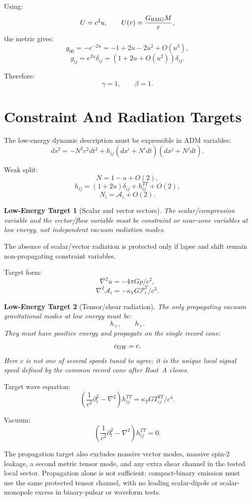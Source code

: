 \documentclass[11pt]{article}
\newtheorem{target}{Low-Energy Target}
\begin{document}
Using:
\[
U=c^2u,
\qquad
U(r)=\frac{G_{\rm RMG}M}{r},
\]
the metric gives:
\[
g_{00}
=
-e^{-2u}
=
-1+2u-2u^2+O(u^3),
\]
\[
g_{ij}
=
e^{2u}\delta_{ij}
=
(1+2u+O(u^2))\delta_{ij}.
\]

Therefore:
\[
\boxed{
\gamma=1,
\qquad
\beta=1.
}
\]

\section{Constraint And Radiation Targets}

The low-energy dynamic description must be expressible in ADM variables:
\[
ds^2
=
-N^2c^2dt^2
+h_{ij}(dx^i+N^idt)(dx^j+N^jdt).
\]

Weak split:
\[
N=1-u+O(2),
\]
\[
h_{ij}=(1+2u)\delta_{ij}+h_{ij}^{TT}+O(2),
\]
\[
N_i=\mathcal A_i+O(2).
\]

\begin{target}[Scalar and vector sectors]
The scalar/compression variable and the vector/flow variable must be
constraint or near-zone variables at low energy, not independent vacuum
radiation modes.
\end{target}

The absence of scalar/vector radiation is protected only if lapse and shift
remain non-propagating constraint variables.

Target form:
\[
\nabla^2u=-4\pi G\rho/c^2,
\]
\[
\nabla^2\mathcal A_i
=
-
\kappa_VG\mathcal P_i^T/c^3.
\]

\begin{target}[Tensor/shear radiation]
The only propagating vacuum gravitational modes at low energy must be:
\[
h_+,
\qquad
h_\times.
\]
They must have positive energy and propagate on the single record cone:
\[
c_{\rm GW}=c.
\]
Here \(c\) is not one of several speeds tuned to agree; it is the unique local
signal speed defined by the common record cone after Root~A closes.
\end{target}

Target wave equation:
\[
\left(
\frac{1}{c^2}\partial_t^2-\nabla^2
\right)h_{ij}^{TT}
=
\kappa_TGT_{ij}^{TT}/c^4.
\]

Vacuum:
\[
\left(
\frac{1}{c^2}\partial_t^2-\nabla^2
\right)h_{ij}^{TT}=0.
\]

The propagation target also excludes massive vector modes, massive spin-2
leakage, a second metric tensor mode, and any extra shear channel in the
tested local sector.  Propagation alone is not sufficient: compact-binary
emission must use the same protected tensor channel, with no leading
scalar-dipole or scalar-monopole excess in binary-pulsar or waveform tests.
\end{document}

